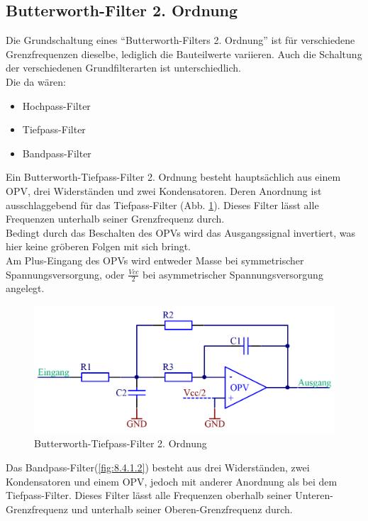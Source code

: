 \subsection{Butterworth-Filter 2. Ordnung}\label{subsec:8.4.1}
Die Grundschaltung eines \enquote{Butterworth-Filters 2. Ordnung} ist für verschiedene Grenzfrequenzen dieselbe, lediglich die Bauteilwerte variieren.
Auch die Schaltung der verschiedenen Grundfilterarten ist unterschiedlich. \\
Die da wären: 
\begin{itemize}
	\item Hochpass-Filter
	\item Tiefpass-Filter
	\item Bandpass-Filter
\end{itemize}
Ein Butterworth-Tiefpass-Filter 2. Ordnung besteht hauptsächlich aus einem OPV, drei Widerständen und zwei Kondensatoren.
Deren Anordnung ist ausschlaggebend für das Tiefpass-Filter (Abb. \ref{fig:8.4.1.1}).
Dieses Filter lässt alle Frequenzen unterhalb seiner Grenzfrequenz durch.\\ 
Bedingt durch das Beschalten des OPVs wird das Ausgangssignal invertiert, was hier keine gröberen Folgen mit sich bringt.\\ 
Am Plus-Eingang des OPVs wird entweder Masse bei symmetrischer Spannungsversorgung, oder $\frac{Vcc}{2}$ bei asymmetrischer Spannungsversorgung angelegt.
\begin{figure} [H]
	\centering
	\includegraphics[width=1\textwidth]{img/Print3/TPFilterButterworth2Ordnung.PNG}
	\caption{Butterworth-Tiefpass-Filter 2. Ordnung}
	\label {fig:8.4.1.1}
\end{figure}
Das Bandpass-Filter(\ref{fig:8.4.1.2}) besteht aus drei Widerständen, zwei Kondensatoren und einem OPV, jedoch mit anderer Anordnung als bei dem Tiefpass-Filter.
Dieses Filter lässt alle Frequenzen oberhalb seiner Unteren-Grenzfrequenz und unterhalb seiner Oberen-Grenzfrequenz durch.
